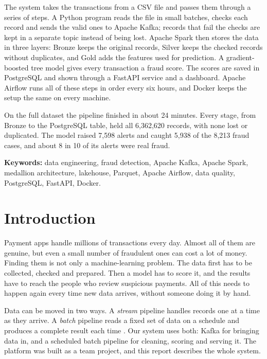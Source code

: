 \documentclass[11pt,a4paper]{article}
\begin{document}
The system takes the transactions from a CSV file and passes them through a
series of steps. A Python program reads the file in small batches, checks each
record and sends the valid ones to Apache Kafka; records that fail the checks
are kept in a separate topic instead of being lost. Apache Spark then stores the
data in three layers: Bronze keeps the original records, Silver keeps the
checked records without duplicates, and Gold adds the features used for
prediction. A gradient-boosted tree model gives every transaction a fraud score.
The scores are saved in PostgreSQL and shown through a FastAPI service and a
dashboard. Apache Airflow runs all of these steps in order every six hours, and
Docker keeps the setup the same on every machine.

On the full dataset the pipeline finished in about 24 minutes. Every stage, from
Bronze to the PostgreSQL table, held all 6,362,620 records, with none lost or
duplicated. The model raised 7,598 alerts and caught 5,938 of the 8,213 fraud
cases, and about 8 in 10 of its alerts were real fraud.

\vspace{0.4cm}
\noindent\textbf{Keywords:} data engineering, fraud detection, Apache Kafka,
Apache Spark, medallion architecture, lakehouse, Parquet, Apache Airflow, data
quality, PostgreSQL, FastAPI, Docker.

\clearpage
\tableofcontents
\clearpage
\listoffigures
\listoftables
\clearpage

\setcounter{page}{1}

\section{Introduction}

Payment apps handle millions of transactions every day. Almost all of them are
genuine, but even a small number of fraudulent ones can cost a lot of money.
Finding them is not only a machine-learning problem. The data first has to be
collected, checked and prepared. Then a model has to score it, and the results
have to reach the people who review suspicious payments. All of this needs to
happen again every time new data arrives, without someone doing it by hand.

Data can be moved in two ways. A \emph{stream} pipeline handles records one at a
time as they arrive. A \emph{batch} pipeline reads a fixed set of data on a
schedule and produces a complete result each time \citep{akidau2015dataflow}.
Our system uses both: Kafka for bringing data in, and a scheduled batch pipeline
for cleaning, scoring and serving it. The platform was built as a team project,
and this report describes the whole system.
\end{document}
